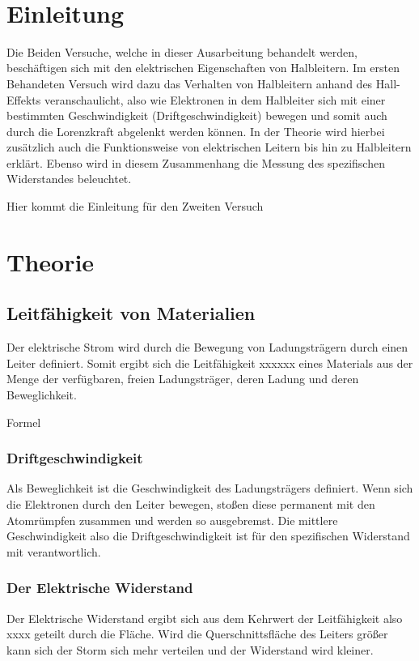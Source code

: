 \documentclass[a4paper]{scrartcl}
\def\header#1#2{
  \begin{center}
    {\Large #1}\\
    {#2}
  \end{center}
}
\numberwithin{equation}{subsection}
\begin{document}
\vspace{10pt}
\header{\HEADDING}{\SUBHEADDING}

\tableofcontents

\newpage

\section{Einleitung}
Die Beiden Versuche, welche in dieser Ausarbeitung behandelt werden, beschäftigen sich mit den elektrischen Eigenschaften von Halbleitern. Im ersten Behandeten Versuch wird dazu das Verhalten von Halbleitern anhand des Hall-Effekts veranschaulicht, also wie Elektronen in dem Halbleiter sich mit einer bestimmten Geschwindigkeit (Driftgeschwindigkeit) bewegen und somit auch durch die Lorenzkraft abgelenkt werden können. In der Theorie wird hierbei zusätzlich auch die Funktionsweise von elektrischen Leitern bis hin zu Halbleitern erklärt.
Ebenso wird in diesem Zusammenhang die Messung des spezifischen Widerstandes beleuchtet.

Hier kommt die Einleitung für den Zweiten Versuch \cite{tipler}
\cite{werk}
\cite{anl}
\cite{hering}

\newpage

\section{Theorie}
\subsection{Leitfähigkeit von Materialien}
Der elektrische Strom wird durch die Bewegung von Ladungsträgern durch einen Leiter definiert.
Somit ergibt sich die Leitfähigkeit xxxxxx eines Materials aus der Menge der verfügbaren, freien Ladungsträger, deren Ladung und deren Beweglichkeit.

Formel

\subsubsection{Driftgeschwindigkeit}
Als Beweglichkeit ist die Geschwindigkeit des Ladungsträgers definiert. Wenn sich die Elektronen durch den Leiter bewegen, stoßen diese permanent mit den Atomrümpfen zusammen und werden so ausgebremst. Die mittlere Geschwindigkeit also die Driftgeschwindigkeit ist für den spezifischen Widerstand mit verantwortlich.

\subsubsection{Der  Elektrische Widerstand}
Der Elektrische Widerstand ergibt sich aus dem Kehrwert der Leitfähigkeit also xxxx geteilt durch die Fläche.
Wird die Querschnittsfläche des Leiters größer kann sich der Storm sich mehr verteilen und der Widerstand wird kleiner.
\end{document}
